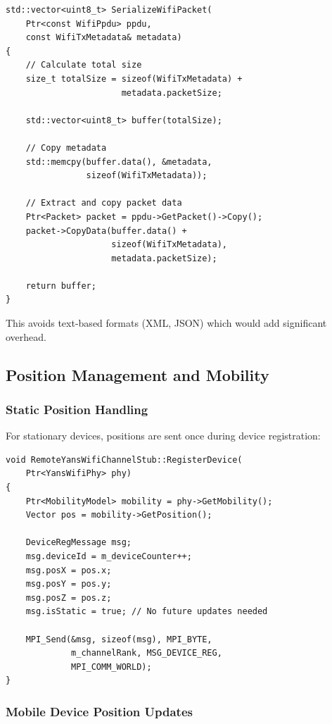 \begin{lstlisting}[style=cpp, caption={Binary packet serialization}]
std::vector<uint8_t> SerializeWifiPacket(
    Ptr<const WifiPpdu> ppdu,
    const WifiTxMetadata& metadata)
{
    // Calculate total size
    size_t totalSize = sizeof(WifiTxMetadata) + 
                       metadata.packetSize;
    
    std::vector<uint8_t> buffer(totalSize);
    
    // Copy metadata
    std::memcpy(buffer.data(), &metadata, 
                sizeof(WifiTxMetadata));
    
    // Extract and copy packet data
    Ptr<Packet> packet = ppdu->GetPacket()->Copy();
    packet->CopyData(buffer.data() + 
                     sizeof(WifiTxMetadata),
                     metadata.packetSize);
    
    return buffer;
}
\end{lstlisting}

This avoids text-based formats (XML, JSON) which would add significant overhead.

\subsection{Position Management and Mobility}

\subsubsection{Static Position Handling}

For stationary devices, positions are sent once during device registration:

\begin{lstlisting}[style=cpp, caption={Static position registration}]
void RemoteYansWifiChannelStub::RegisterDevice(
    Ptr<YansWifiPhy> phy)
{
    Ptr<MobilityModel> mobility = phy->GetMobility();
    Vector pos = mobility->GetPosition();
    
    DeviceRegMessage msg;
    msg.deviceId = m_deviceCounter++;
    msg.posX = pos.x;
    msg.posY = pos.y;
    msg.posZ = pos.z;
    msg.isStatic = true; // No future updates needed
    
    MPI_Send(&msg, sizeof(msg), MPI_BYTE, 
             m_channelRank, MSG_DEVICE_REG, 
             MPI_COMM_WORLD);
}
\end{lstlisting}

\subsubsection{Mobile Device Position Updates}

